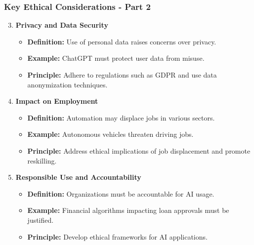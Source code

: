 \documentclass[aspectratio=169]{beamer}
\begin{document}
\begin{frame}[fragile]
    \frametitle{Key Ethical Considerations - Part 2}
    \begin{enumerate}
        \setcounter{enumi}{2} %
        \item \textbf{Privacy and Data Security}
            \begin{itemize}
                \item \textbf{Definition:} Use of personal data raises concerns over privacy.
                \item \textbf{Example:} ChatGPT must protect user data from misuse.
                \item \textbf{Principle:} Adhere to regulations such as GDPR and use data anonymization techniques.
            \end{itemize}
        
        \item \textbf{Impact on Employment}
            \begin{itemize}
                \item \textbf{Definition:} Automation may displace jobs in various sectors.
                \item \textbf{Example:} Autonomous vehicles threaten driving jobs.
                \item \textbf{Principle:} Address ethical implications of job displacement and promote reskilling.
            \end{itemize}
        
        \item \textbf{Responsible Use and Accountability}
            \begin{itemize}
                \item \textbf{Definition:} Organizations must be accountable for AI usage.
                \item \textbf{Example:} Financial algorithms impacting loan approvals must be justified.
                \item \textbf{Principle:} Develop ethical frameworks for AI applications.
            \end{itemize}
    \end{enumerate}
\end{frame}
\end{document}
